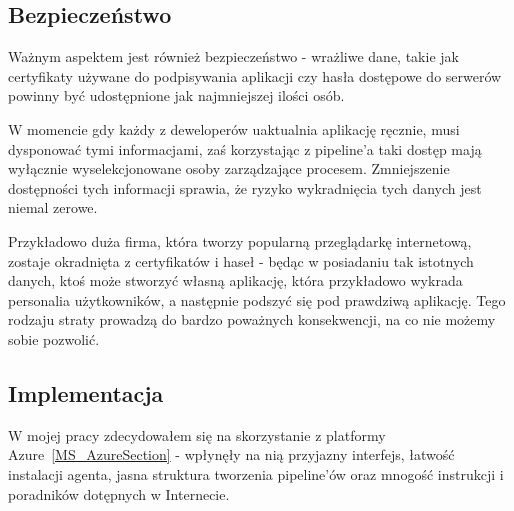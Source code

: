 \subsection{Bezpieczeństwo}
Ważnym aspektem jest również bezpieczeństwo - wrażliwe dane, takie jak certyfikaty używane do podpisywania aplikacji czy
hasła dostępowe do serwerów powinny być udostępnione jak najmniejszej ilości osób.

W momencie gdy każdy z deweloperów uaktualnia aplikację ręcznie, musi dysponować tymi informacjami,
zaś korzystając z pipeline'a taki dostęp mają wyłącznie wyselekcjonowane osoby zarządzające procesem.
Zmniejszenie dostępności tych informacji sprawia, że ryzyko wykradnięcia tych danych jest niemal zerowe.

Przykładowo duża firma, która tworzy popularną przeglądarkę internetową, zostaje okradnięta z certyfikatów i haseł - 
będąc w posiadaniu tak istotnych danych, ktoś może stworzyć własną aplikację, która przykładowo wykrada personalia użytkowników, 
a następnie podszyć się pod prawdziwą aplikację. 
Tego rodzaju straty prowadzą do bardzo poważnych konsekwencji, na co nie możemy sobie pozwolić.
\newpage

\subsection{Implementacja}
W mojej pracy zdecydowałem się na skorzystanie z platformy Azure~\ref{MS_AzureSection} - wpłynęły
na nią przyjazny interfejs, łatwość instalacji agenta, jasna struktura tworzenia pipeline'ów 
oraz mnogość instrukcji i poradników dotępnych w Internecie.


